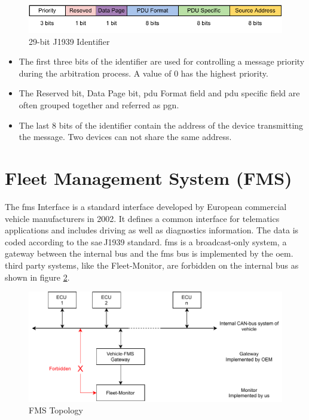 \begin{figure}[h!]
	\centering
	\includegraphics[width=\textwidth]{images/j1939-identifier}
	\caption{29-bit J1939 Identifier}
	\label{fig:29-bit_J1939_Identifier}
\end{figure}
\begin{itemize}
	\item The first three bits of the identifier are used for controlling a message priority during the arbitration process. A value of 0 has the highest priority.
	\item The Reserved bit, Data Page bit, \acrfull{pdu} Format field and \acrshort{pdu} specific field are often grouped together and referred as \acrfull{pgn}. 
	\item The last 8 bits of the identifier contain the address of the device transmitting the message. Two devices can not share the same address.
\end{itemize}
\newpage

\section{Fleet Management System (FMS)} \label{Fleet Management System (FMS)}
The \acrfull{fms} Interface is a standard interface developed by European commercial vehicle manufacturers in 2002. It defines a common interface for telematics applications and includes driving as well as diagnostics information. The data is coded according to the \acrshort{sae}\,J1939 standard. \acrshort{fms} is a broadcast-only system, a gateway between the internal bus and the \acrshort{fms} bus is implemented by the \acrshort{oem}. third party systems, like the Fleet-Monitor, are forbidden on the internal bus as shown in figure \ref{fig:fms-bus}. 

\begin{figure}[h!]
	\centering
	\hfuzz=14.0pt
	\includegraphics[width=\textwidth]{images/fms-bus}
	\vspace{-0.2cm}
	\caption{FMS Topology}
	\label{fig:fms-bus}
\end{figure}

